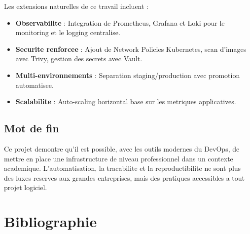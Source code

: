 \documentclass[12pt,a4paper,french]{report}
\begin{document}
Les extensions naturelles de ce travail incluent :

\begin{itemize}
    \item \textbf{Observabilite} : Integration de Prometheus, Grafana et Loki pour le monitoring et le logging centralise.
    \item \textbf{Securite renforcee} : Ajout de Network Policies Kubernetes, scan d'images avec Trivy, gestion des secrets avec Vault.
    \item \textbf{Multi-environnements} : Separation staging/production avec promotion automatisee.
    \item \textbf{Scalabilite} : Auto-scaling horizontal base sur les metriques applicatives.
\end{itemize}

\section{Mot de fin}

Ce projet demontre qu'il est possible, avec les outils modernes du DevOps, de mettre en place une infrastructure de niveau professionnel dans un contexte academique. L'automatisation, la tracabilite et la reproductibilite ne sont plus des luxes reserves aux grandes entreprises, mais des pratiques accessibles a tout projet logiciel.

\chapter*{Bibliographie}
\end{document}
